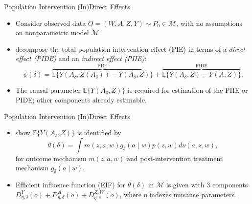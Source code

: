 \documentclass{beamer}
\begin{document}

\begin{frame}[c]{Population Intervention (In)Direct Effects}
\begin{center}
\begin{itemize}
\itemsep2pt
\item Consider observed data $O = (W, A, Z, Y) \sim P_0 \in \mathcal{M}$, with
  no assumptions on nonparametric model $\mathcal{M}$.
\item \cite{diaz2020causal} decompose the total population intervention effect
  (PIE) in terms of a \textit{direct effect (PIDE)} and an \textit{indirect
  effect (PIIE)}:
  \begin{equation*}
    \psi(\delta) = \overbrace{\mathbb{E}\{Y(A_\delta, Z(A_\delta)) -
       Y(A_\delta, Z)\}}^{\text{PIIE}} + \overbrace{\mathbb{E}\{Y(A_\delta, Z)
       - Y(A, Z)\}}^{\text{PIDE}}.
  \end{equation*}
\item The causal parameter $\mathbb{E}\{Y(A_\delta, Z)\}$ is required for
  estimation of the PIIE or PIDE; other components already estimable.
\end{itemize}
\end{center}

\note{
}

\end{frame}


\begin{frame}[c]{Population Intervention (In)Direct Effects}

\begin{center}
\begin{itemize}
\itemsep2pt
\item \cite{diaz2020causal} show $\mathbb{E}\{Y(A_\delta, Z)\}$ is identified by
  \begin{equation*}
    \theta(\delta) = \int m(z, a, w)g_{\delta}(a\mid w)p(z,w) d\nu(a,z,w),
  \end{equation*}
  for outcome mechanism $m(z,a,w)$ and post-intervention treatment mechanism
  $g_{\delta}(a\mid w)$.
\item Efficient influence function (EIF) for $\theta(\delta)$ in $\mathcal{M}$
  is given with 3 components $D^Y_{\eta, \delta}(o) + D^A_{\eta, \delta}(o) +
  D^{Z, W}_{\eta, \delta}(o)$, where $\eta$ indexes nuisance parameters.
\end{itemize}
\end{center}

\note{
}

\end{frame}
\end{document}
